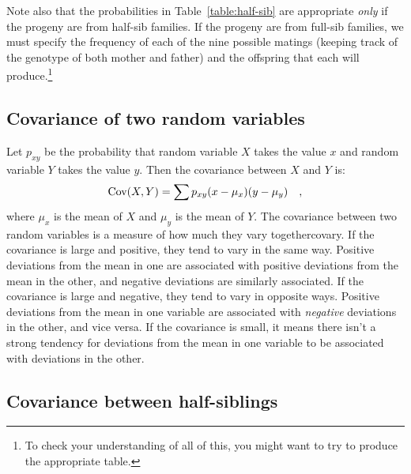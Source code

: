 \documentclass[12pt]{article}
\begin{document}
Note also that the probabilities in Table~\ref{table:half-sib} are
appropriate {\it only\/} if the progeny are from half-sib families.
If the progeny are from full-sib families, we must specify the
frequency of each of the nine possible matings (keeping track of the
genotype of both mother and father) and the offspring that each will
produce.\footnote{To check your understanding of all of this, you
might want to try to produce the appropriate table.}

\subsection*{Covariance of two random variables}

Let $p_{xy}$ be the probability that random variable $X$ takes the
value $x$ and random variable $Y$ takes the value $y$.  Then the
covariance between $X$ and $Y$ is:
\[
\mbox{Cov}(X,Y) = \sum p_{xy}(x - \mu_x)(y - \mu_y) \quad ,
\]
where $\mu_x$ is the mean of $X$ and $\mu_y$ is the mean of $Y$. The
covariance between two random variables is a measure of how much they
vary together{\dash}covary. If the covariance is large and positive,
they tend to vary in the same way. Positive deviations from the mean
in one are associated with positive deviations from the mean in the
other, and negative deviations are similarly associated. If the
covariance is large and negative, they tend to vary in opposite
ways. Positive deviations from the mean in one variable are associated
with {\it negative\/} deviations in the other, and vice versa. If the
covariance is small, it means there isn't a strong tendency for
deviations from the mean in one variable to be associated with
deviations in the other.

\subsection*{Covariance between half-siblings}
\end{document}
